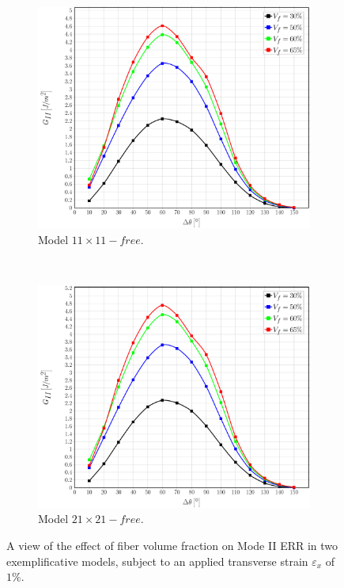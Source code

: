 \documentclass[review]{elsarticle}
\begin{document}
\begin{figure}[!h]
\centering
    \begin{subfigure}[b]{0.475\textwidth}
        \includegraphics[width=\textwidth]{vf-smallermodel-GII.pdf}
        \caption{Model $11\times 11-free$.}\label{subfig:volfracsmallerMII}
    \end{subfigure} ~
    \begin{subfigure}[b]{0.475\textwidth}
        \includegraphics[width=\textwidth]{vf-biggermodel-GII.pdf}
        \caption{Model $21\times 21-free$.}\label{subfig:volfracbiggerMII}
    \end{subfigure}

\caption{A view of the effect of fiber volume fraction on Mode II ERR in two exemplificative models, subject to an applied transverse strain $\varepsilon_{x}$ of $1\%$.}\label{fig:volumefractionMII}
\end{figure}
\end{document}
